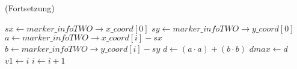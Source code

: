 \begin{algorithm}[ht]
\caption{ (Fortsetzung)}
\label{alg:checksquare-2}
\begin{algorithmic}[1]
	\State $\mathit{sx} \gets \mathit{marker\_infoTWO \to x\_coord}[0]$
	\label{alg:checksquare-2-x}
	\State $\mathit{sy} \gets \mathit{marker\_infoTWO \to y\_coord}[0]$
	\label{alg:checksquare-2-y}
	\label{alg:checksquare-2-loop-start}
		\State $a \gets \mathit{marker\_infoTWO \to x\_coord}[i] - \mathit{sx}$
		\State $b \gets \mathit{marker\_infoTWO \to y\_coord}[i] - \mathit{sy}$
		\State $d \gets \left(a \cdot a\right) + \left(b \cdot b\right)$
		\label{alg:checksquare-2-isdbigger}
			\State $\mathit{dmax} \gets d$
			\State $\mathit{v1} \gets i$
		\EndIf
		\State $i \gets i + 1$
	\EndFor
	\label{alg:checksquare-2-loop-end}
\end{algorithmic}
\end{algorithm}
